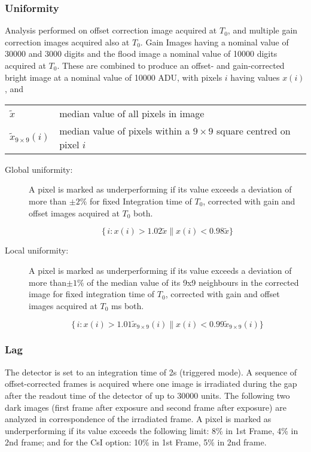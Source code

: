 \documentclass[\main/IO-Pixels.tex]{subfiles}
\begin{document}
\subsubsection{Uniformity}
Analysis performed on offset correction image acquired at $T_0$, and multiple gain correction images acquired also at $T_0$. Gain Images having a nominal value of 30000 and 3000 digits and the flood image a nominal value of 10000 digits acquired at $T_0$. These are combined to produce an offset- and gain-corrected bright image at a nominal value of 10000 ADU, with pixels $i$ having values $x(i)$, and

\begin{tabular}{p{}p{}}
$\tilde{x}$ & median value of all pixels in image \\
$\tilde{x}_{9\times9}(i)$ & median value of pixels within a $9\times9$ square centred on pixel $i$
\end{tabular}

\begin{description}

\item[Global uniformity:] A pixel is marked as underperforming if its value exceeds a deviation of more than $\pm 2\%$ for fixed Integration time of $T_0$, corrected with gain and offset images acquired at $T_0$ both.

\vspace{-15pt}
\begin{equation*}
    \big\{ \, i: x(i) > 1.02 \tilde{x} \parallel x(i) < 0.98 \tilde{x} \big\}
\end{equation*}

\item[Local uniformity:] A pixel is marked as underperforming if its value exceeds a deviation of more than$\pm1\%$ of the median value of its 9x9 neighbours in the corrected image for fixed integration time of $T_0$, corrected with gain and offset images acquired at $T_0$ ms both.

\vspace{-15pt}
\begin{equation*}
      \big\{ \, i: x(i) > 1.01 \tilde{x}_{9\times9}(i) \parallel x(i) < 0.99 \tilde{x}_{9\times9}(i) \big\}
\end{equation*}

\end{description}

\subsubsection{Lag}
The detector is set to an integration time of 2s (triggered mode). A sequence of offset-corrected frames is acquired where one image is irradiated during the gap after the readout time of the detector of up to 30000 units. The following two dark images (first frame after exposure and second frame after exposure) are analyzed in correspondence of the irradiated frame. A pixel is marked as underperforming if its value exceeds the following limit: 8\% in 1st Frame, 4\% in 2nd frame; and for the CsI option: 10\% in 1st Frame, 5\% in 2nd frame. 
\end{document}
